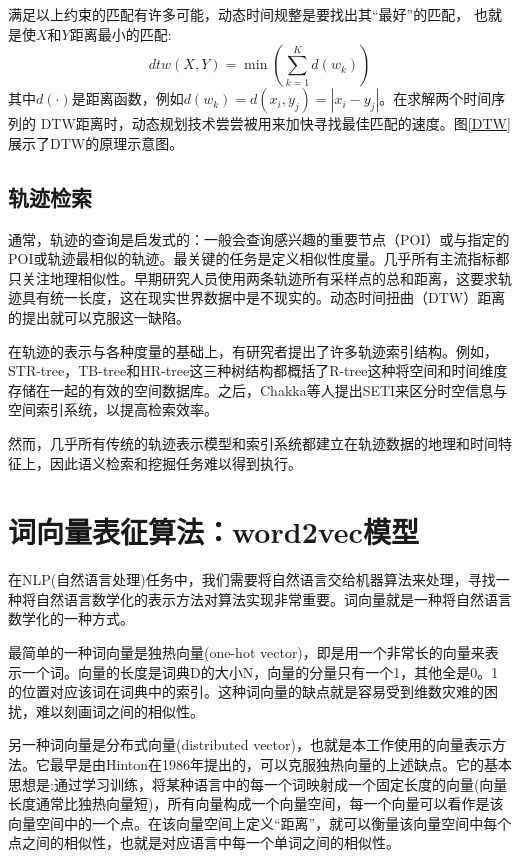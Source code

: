 
满足以上约束的匹配有许多可能，动态时间规整是要找出其“最好”的匹配， 也就是使$X$和$Y$距离最小的匹配:
\begin{equation}
d t w ( X , Y ) = \min \left( \sum _ { k = 1 } ^ { K } d \left( w _ { k } \right) \right)
\end{equation}
其中$d(\cdot)$是距离函数，例如$d \left( w _ { k } \right) = d \left( x _ { i } , y _ { j } \right) = \left| x _ { i } - y _ { j } \right|$。在求解两个时间序列的 DTW距离时，动态规划技术尝尝被用来加快寻找最佳匹配的速度。图\ref{DTW}展示了DTW的原理示意图。


\subsection{轨迹检索}
通常，轨迹的查询是启发式的：一般会查询感兴趣的重要节点（POI）或与指定的POI或轨迹最相似的轨迹。最关键的任务是定义相似性度量。几乎所有主流指标都只关注地理相似性。早期研究人员\cite{agrawal1993efficient}使用两条轨迹所有采样点的总和距离，这要求轨迹具有统一长度，这在现实世界数据中是不现实的。动态时间扭曲（DTW）距离的提出就可以克服这一缺陷。

在轨迹的表示与各种度量的基础上，有研究者提出了许多轨迹索引结构。例如，STR-tree\cite{pfoser2000novel}，TB-tree\cite{pfoser2000novel}和HR-tree\cite{nascimento1998towards}这三种树结构都概括了R-tree这种将空间和时间维度存储在一起的有效的空间数据库。之后，Chakka等人提出SETI\cite{chakka2003indexing}来区分时空信息与空间索引系统，以提高检索效率。

然而，几乎所有传统的轨迹表示模型和索引系统都建立在轨迹数据的地理和时间特征上，因此语义检索和挖掘任务难以得到执行。


\section{词向量表征算法：word2vec模型}
在NLP(自然语言处理)任务中，我们需要将自然语言交给机器算法来处理，寻找一种将自然语言数学化的表示方法对算法实现非常重要。词向量就是一种将自然语言数学化的一种方式。

最简单的一种词向量是独热向量(one-hot vector)\cite{turian2010word}，即是用一个非常长的向量来表示一个词。向量的长度是词典D的大小N，向量的分量只有一个1，其他全是0。1的位置对应该词在词典中的索引。这种词向量的缺点就是容易受到维数灾难的困扰，难以刻画词之间的相似性。

另一种词向量是分布式向量(distributed vector)，也就是本工作使用的向量表示方法。它最早是由Hinton\cite{hinton1984distributed}在1986年提出的，可以克服独热向量的上述缺点。它的基本思想是:通过学习训练，将某种语言中的每一个词映射成一个固定长度的向量(向量长度通常比独热向量短)，所有向量构成一个向量空间，每一个向量可以看作是该向量空间中的一个点。在该向量空间上定义“距离”，就可以衡量该向量空间中每个点之间的相似性，也就是对应语言中每一个单词之间的相似性。

